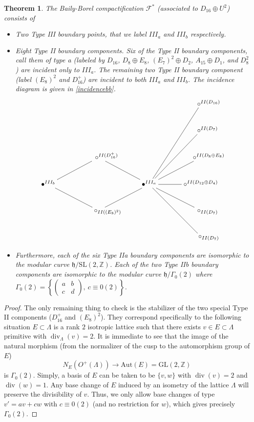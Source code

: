 \documentclass[11pt]{amsart}
\numberwithin{equation}{section}
\theoremstyle{plain}
\newtheorem{theorem}{Theorem}[section]
\theoremstyle{remark}
\theoremstyle{definition}
\newcommand{\bZ}{\mathbb{Z}}
\newcommand{\fh}{\mathfrak{h}}
\newcommand{\calF}{\mathcal{F}}
\newcommand{\Aut}{\mathrm{Aut}}
\newcommand{\GL}{\mathrm{GL}}
\newcommand{\SL}{\mathrm{SL}}
\DeclareMathOperator{\divisore}{div}
\begin{document}
\begin{theorem}\label{thm:thmbbstrata}
The Baily-Borel compactification $\calF^*$ (associated to $D_{16}\oplus U^2$) consists of
\begin{itemize}
\item[i)] Two Type III boundary points, that we label $III_a$ and $III_b$ respectively.
\item[ii)] Eight Type II boundary components. Six of the Type II boundary components, call them of {\it type a} (labeled by $D_{16}$, $D_8\oplus E_8$, $(E_7)^2\oplus D_2$, $A_{15}\oplus D_1$, and $D_{8}^2$) are incident only to $III_a$. The remaining two Type II boundary component (label $(E_8)^2$ and $D_{16}^+$) are incident to both $III_a$ and $III_b$. The incidence diagram is given in \eqref{incidencebb}. 
\begin{equation}\label{incidencebb}
\xymatrix{
&&& \ \ \ \ \ \ \ \circ^{II(D_{16})}\\ 
&&& \ \ \ \ \ \ \circ^{II(D_7)}\\ 
 & \ \ \ \ \ \ \ \circ^{II(D_{16}^+)}\ar@{-}[rd]&& \ \ \ \ \ \ \ \circ^{II(D_8\oplus E_8)}\\
 \bullet^{III_b}\ar@{-}[ru]\ar@{-}[rd]&&\bullet^{III_a}\ar@{-}[ruuu]\ar@{-}[ruu]\ar@{-}[ru]\ar@{-}[r]\ar@{-}[rd]\ar@{-}[rdd]&\circ^{II(D_{12}\oplus D_4)}\\
&\ \ \ \ \ \ \ \ \circ_{II((E_8)^2)}\ar@{-}[ru]&& \ \ \ \ \ \ \circ_{II(D_7)}\\
&&& \ \ \ \ \ \ \ \circ_{II(D_7)}\\ 
}
\end{equation}
\item[iii)] Furthermore, each of the six Type IIa boundary components are isomorphic to the modular curve $\fh/ \SL(2,\bZ)$. Each of the two Type IIb boundary components are isomorphic to the modular curve $\fh/\Gamma_0(2)$ where $\Gamma_0(2)=\left\{\left(\begin{matrix} a&b\\c&d\end{matrix}\right), \ c\equiv 0 (2)\right\}$.
\end{itemize}
\end{theorem}
\begin{proof}
The only remaining thing to check is the stabilizer of the two special Type II components ($D_{16}^+$ and $(E_8)^2$).  They correspond specifically to the following situation $E\subset \Lambda$ is a rank $2$ isotropic lattice such that there exists $v\in E\subset \Lambda$ primitive with $\divisore_{\Lambda}(v)=2$. It is immediate to see that the image of the natural morphism (from the normalizer of the cusp to the automorphism group of $E$)
$$N_E(O^+(\Lambda))\to \Aut(E)=\GL(2,\bZ)$$
is $\Gamma_0(2)$. Simply, a basis of $E$ can be taken to be $\{v,w\}$ with $\divisore(v)=2$ and $\divisore(w)=1$. Any base change of $E$ induced by an isometry of the lattice $\Lambda$ will preserve the divisibility of $v$. Thus, we only allow base changes of type 
$v'=av+cw$ with $c\equiv 0 (2)$ (and no restriction for $w$), which gives precisely $\Gamma_0(2)$. 
\end{proof}
\end{document}
